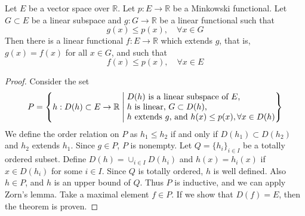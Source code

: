 \begin{thm} Let $E$ be a vector space over $\mathbb{R}$. Let $p:E\rightarrow \mathbb{R}$ be a Minkowski functional. Let $G\subset E$ be a linear subspace and $g:G\rightarrow \mathbb{R}$ be a linear functional such that
\begin{equation}
g(x)\leq p(x),\quad \forall x\in G
\end{equation}
Then there is a linear functional $f:E\rightarrow \mathbb{R}$ which extends $g$, that is, $g(x)=f(x)$ for all $x\in G$, and such that
\begin{equation}
f(x)\leq p(x),\quad \forall x\in E
\end{equation}
\end{thm}
\begin{proof}
Consider the set
\begin{equation}
P=\left\lbrace h:D(h)\subset E\rightarrow \mathbb{R} \;\middle|\;
  \begin{tabular}{@{}l@{}}
    $D(h)$ is a linear subspace of $E$,\\
    $h$ is linear, $G\subset D(h)$,\\
    $h$ extends $g$, and $h(x)\leq p(x),\forall x\in D(h)$
   \end{tabular}
  \right\rbrace
\end{equation}
We define the order relation on $P$ as $h_1\leq h_2$ if and only if $D(h_1)\subset D(h_2)$ and $h_2$ extends $h_1$. Since $g\in P$, $P$ is nonempty. Let $Q=\{h_i\}_{i\in I}$ be a totally ordered subset. Define $D(h)=\cup_{i\in I}D(h_i)$ and $h(x)=h_i(x)$ if $x\in D(h_i)$ for some $i\in I$. Since $Q$ is totally ordered, $h$ is well defined. Also $h\in P$, and $h$ is an upper bound of $Q$. Thus $P$ is inductive, and we can apply Zorn's lemma. Take a maximal element $f\in P$. If we show that $D(f)=E$, then the theorem is proven.


\end{proof}
